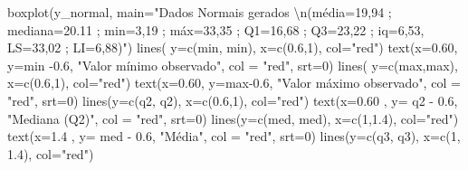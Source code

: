 \documentclass[
]{book}
\newenvironment{Shaded}{\begin{snugshade}}{\end{snugshade}}
\newcommand{\AttributeTok}[1]{\textcolor[rgb]{0.77,0.63,0.00}{#1}}
\newcommand{\DecValTok}[1]{\textcolor[rgb]{0.00,0.00,0.81}{#1}}
\newcommand{\FloatTok}[1]{\textcolor[rgb]{0.00,0.00,0.81}{#1}}
\newcommand{\FunctionTok}[1]{\textcolor[rgb]{0.00,0.00,0.00}{#1}}
\newcommand{\NormalTok}[1]{#1}
\newcommand{\SpecialCharTok}[1]{\textcolor[rgb]{0.00,0.00,0.00}{#1}}
\newcommand{\StringTok}[1]{\textcolor[rgb]{0.31,0.60,0.02}{#1}}
\begin{document}
\begin{Shaded}
\begin{Highlighting}[]
\FunctionTok{boxplot}\NormalTok{(y\_normal, }\AttributeTok{main=}\StringTok{"Dados Normais gerados }\SpecialCharTok{\textbackslash{}n}\StringTok{(média=19,94 ; mediana=20.11 ; min=3,19 ; máx=33,35 ; Q1=16,68 ; Q3=23,22 ; iq=6,53, LS=33,02 ; LI=6,88)"}\NormalTok{)}
\FunctionTok{lines}\NormalTok{( }\AttributeTok{y=}\FunctionTok{c}\NormalTok{(min, min), }\AttributeTok{x=}\FunctionTok{c}\NormalTok{(}\FloatTok{0.6}\NormalTok{,}\DecValTok{1}\NormalTok{), }\AttributeTok{col=}\StringTok{"red"}\NormalTok{) }
\FunctionTok{text}\NormalTok{(}\AttributeTok{x=}\FloatTok{0.60}\NormalTok{, }\AttributeTok{y=}\NormalTok{min }\SpecialCharTok{{-}}\FloatTok{0.6}\NormalTok{, }\StringTok{"Valor mínimo observado"}\NormalTok{, }\AttributeTok{col =} \StringTok{"red"}\NormalTok{, }\AttributeTok{srt=}\DecValTok{0}\NormalTok{)}
\FunctionTok{lines}\NormalTok{( }\AttributeTok{y=}\FunctionTok{c}\NormalTok{(max,max), }\AttributeTok{x=}\FunctionTok{c}\NormalTok{(}\FloatTok{0.6}\NormalTok{,}\DecValTok{1}\NormalTok{), }\AttributeTok{col=}\StringTok{"red"}\NormalTok{) }
\FunctionTok{text}\NormalTok{(}\AttributeTok{x=}\FloatTok{0.60}\NormalTok{, }\AttributeTok{y=}\NormalTok{max}\FloatTok{{-}0.6}\NormalTok{, }\StringTok{"Valor máximo observado"}\NormalTok{, }\AttributeTok{col =} \StringTok{"red"}\NormalTok{, }\AttributeTok{srt=}\DecValTok{0}\NormalTok{)}
\FunctionTok{lines}\NormalTok{(}\AttributeTok{y=}\FunctionTok{c}\NormalTok{(q2, q2),  }\AttributeTok{x=}\FunctionTok{c}\NormalTok{(}\FloatTok{0.6}\NormalTok{,}\DecValTok{1}\NormalTok{), }\AttributeTok{col=}\StringTok{"red"}\NormalTok{) }
\FunctionTok{text}\NormalTok{(}\AttributeTok{x=}\FloatTok{0.60}\NormalTok{ , }\AttributeTok{y=}\NormalTok{ q2 }\SpecialCharTok{{-}} \FloatTok{0.6}\NormalTok{, }\StringTok{"Mediana (Q2)"}\NormalTok{, }\AttributeTok{col =} \StringTok{"red"}\NormalTok{, }\AttributeTok{srt=}\DecValTok{0}\NormalTok{)}
\FunctionTok{lines}\NormalTok{(}\AttributeTok{y=}\FunctionTok{c}\NormalTok{(med, med),  }\AttributeTok{x=}\FunctionTok{c}\NormalTok{(}\DecValTok{1}\NormalTok{,}\FloatTok{1.4}\NormalTok{), }\AttributeTok{col=}\StringTok{"red"}\NormalTok{) }
\FunctionTok{text}\NormalTok{(}\AttributeTok{x=}\FloatTok{1.4}\NormalTok{ , }\AttributeTok{y=}\NormalTok{ med }\SpecialCharTok{{-}} \FloatTok{0.6}\NormalTok{, }\StringTok{"Média"}\NormalTok{, }\AttributeTok{col =} \StringTok{"red"}\NormalTok{, }\AttributeTok{srt=}\DecValTok{0}\NormalTok{)}
\FunctionTok{lines}\NormalTok{(}\AttributeTok{y=}\FunctionTok{c}\NormalTok{(q3, q3), }\AttributeTok{x=}\FunctionTok{c}\NormalTok{(}\DecValTok{1}\NormalTok{, }\FloatTok{1.4}\NormalTok{), }\AttributeTok{col=}\StringTok{"red"}\NormalTok{) }

\end{Highlighting}
\end{Shaded}
\end{document}
